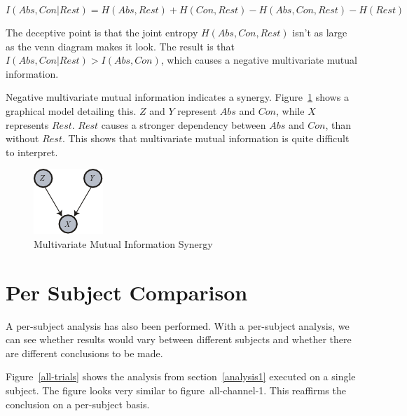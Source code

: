 \begin{equation}
I(Abs, Con | Rest) = H(Abs,Rest)+H(Con,Rest)-H(Abs, Con, Rest)-H(Rest)
\end{equation}

The deceptive point is that the joint entropy $H(Abs, Con, Rest)$ isn't as large as the venn diagram makes it look. The result is that $I(Abs, Con | Rest) > I(Abs, Con)$, which causes a negative multivariate mutual information. 

Negative multivariate mutual information indicates a synergy. Figure~\ref{common} shows a graphical model detailing this. $Z$ and $Y$ represent $Abs$ and $Con$, while $X$ represents $Rest$. $Rest$ causes a stronger dependency between $Abs$ and $Con$, than without $Rest$. This shows that multivariate mutual information is quite difficult to interpret.

\begin{figure}[H]
\caption{Multivariate Mutual Information Synergy}
\label{common}
    \centering
    \includegraphics[]{fig/common}
\end{figure}
    

\section{Per Subject Comparison}

A per-subject analysis has also been performed. With a per-subject analysis, we can see whether results would vary between different subjects and whether there are different conclusions to be made.

Figure~\ref{all-trials} shows the analysis from section~\ref{analysis1} executed on a single subject. The figure looks very similar to figure~{all-channel-1}. This reaffirms the conclusion on a per-subject basis.

